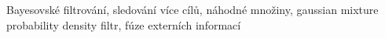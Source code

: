 Bayesovské filtrování, sledování více cílů, náhodné množiny, gaussian mixture probability density filtr, fúze externích informací